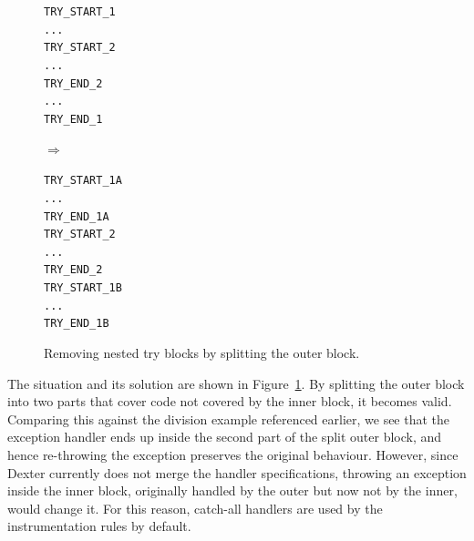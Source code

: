 \documentclass[12pt,twoside,notitlepage]{report}
\newcommand{\asm}[1] {\texttt{#1}}
\begin{document}
\begin{figure}[h]
	\centering
	\begin{minipage}{0.140\textwidth}
	\begin{footnotesize}
		\asm{TRY\_START\_1} \\
		\asm{...} \\
		\asm{TRY\_START\_2} \\
		\asm{...} \\
		\asm{TRY\_END\_2} \\
		\asm{...} \\
		\asm{TRY\_END\_1}
	\end{footnotesize}
	\end{minipage}
	\begin{minipage}{0.09\textwidth}
	\centering
	$\Rightarrow$
	\end{minipage}
	\begin{minipage}{0.150\textwidth}
	\begin{footnotesize}
		\asm{TRY\_START\_1A} \\
		\asm{...} \\
		\asm{TRY\_END\_1A} \\
		\asm{TRY\_START\_2} \\
		\asm{...} \\
		\asm{TRY\_END\_2} \\
		\asm{TRY\_START\_1B} \\
		\asm{...} \\
		\asm{TRY\_END\_1B}
	\end{footnotesize}
	\end{minipage}
	\caption{Removing nested try blocks by splitting the outer block.}
	\label{figure:Instrumentation_TryBlockSplitting}
\end{figure}

The situation and its solution are shown in Figure~\ref{figure:Instrumentation_TryBlockSplitting}. By splitting the outer block into two parts that cover code not covered by the inner block, it becomes valid. Comparing this against the division example referenced earlier, we see that the exception handler ends up inside the second part of the split outer block, and hence re-throwing the exception preserves the original behaviour. However, since Dexter currently does not merge the handler specifications, throwing an exception inside the inner block, originally handled by the outer but now not by the inner, would change it. For this reason, catch-all handlers are used by the instrumentation rules by default. 

\label{section:Code_MethodEntering}
\end{document}
